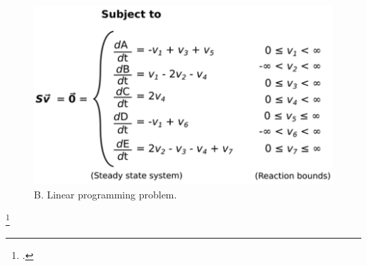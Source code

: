 \documentclass[8pt,usenames,dvipsnames]{beamer}
\begin{document}
\begin{frame}
{\begin{minipage}{0.5\textwidth}
\end{minipage}%
\begin{minipage}{0.5\textwidth}
\begin{figure}
\includegraphics[width=\textwidth]{figures/mass-balance-3}
\caption{B. Linear programming problem.}
\end{figure}

\end{minipage}

}

\footcite{Orth2010}

\end{frame}
\end{document}
